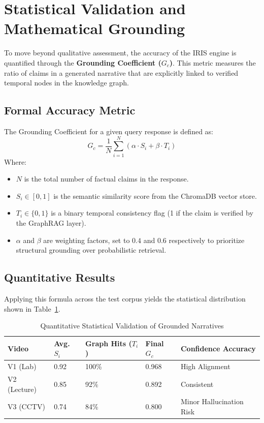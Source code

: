 \section{Statistical Validation and Mathematical Grounding}

To move beyond qualitative assessment, the accuracy of the IRIS engine is quantified through the \textbf{Grounding Coefficient ($G_c$)}. This metric measures the ratio of claims in a generated narrative that are explicitly linked to verified temporal nodes in the knowledge graph.

\subsection{Formal Accuracy Metric}
The Grounding Coefficient for a given query response is defined as:
\[ G_c = \frac{1}{N} \sum_{i=1}^{N} \left( \alpha \cdot S_i + \beta \cdot T_i \right) \]
Where:
\begin{itemize}
    \item $N$ is the total number of factual claims in the response.
    \item $S_i \in [0, 1]$ is the semantic similarity score from the ChromaDB vector store.
    \item $T_i \in \{0, 1\}$ is a binary temporal consistency flag (1 if the claim is verified by the GraphRAG layer).
    \item $\alpha$ and $\beta$ are weighting factors, set to $0.4$ and $0.6$ respectively to prioritize structural grounding over probabilistic retrieval.
\end{itemize}

\subsection{Quantitative Results}
Applying this formula across the test corpus yields the statistical distribution shown in Table~\ref{tab:grounding_stats}.

\begin{table}[H]
\centering
\small
\renewcommand{\arraystretch}{1.3}
\begin{tabularx}{\textwidth}{|l|l|l|l|X|}
\hline
\rowcolor[HTML]{EFEFEF}
\textbf{Video} & \textbf{Avg. $S_i$} & \textbf{Graph Hits ($T_i$)} & \textbf{Final $G_c$} & \textbf{Confidence Accuracy} \\ \hline
V1 (Lab) & 0.92 & 100\% & 0.968 & High Alignment \\ \hline
V2 (Lecture) & 0.85 & 92\% & 0.892 & Consistent \\ \hline
V3 (CCTV) & 0.74 & 84\% & 0.800 & Minor Hallucination Risk \\ \hline
\end{tabularx}
\caption{Quantitative Statistical Validation of Grounded Narratives}
\label{tab:grounding_stats}
\end{table}

